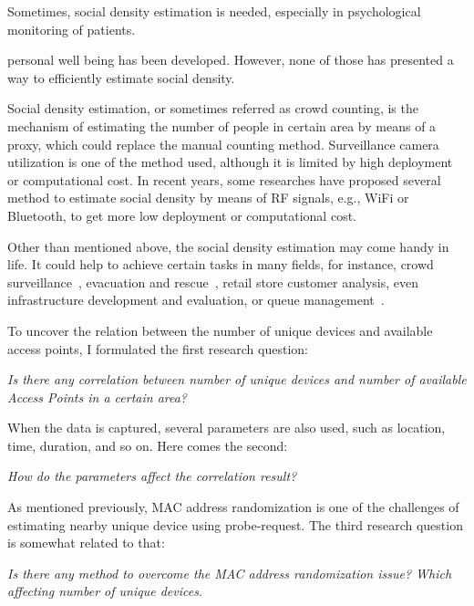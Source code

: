 Sometimes, social density estimation is needed, especially in psychological monitoring of patients.

personal well being has been developed. However, none of those has presented a way to efficiently estimate social density.

Social density estimation, or sometimes referred as crowd counting, is the mechanism of estimating the number of people in certain area by means of a proxy, which could replace the manual counting method. Surveillance camera utilization is one of the method used, although it is limited by high deployment or computational cost. In recent years, some researches have proposed several method to estimate social density by means of RF signals, e.g., WiFi or Bluetooth, to get more low deployment or computational cost.

Other than mentioned above, the social density estimation may come handy in life. It could help to achieve certain tasks in many fields, for instance, crowd surveillance~\cite{thesis050}, evacuation and rescue~\cite{thesis045}, retail store customer analysis, even infrastructure development and evaluation, or queue management~\cite{thesis012}.




To uncover the relation between the number of unique devices and available access points, I formulated the first research question:
\begin{displayquote}\textit{
Is there any correlation between number of unique devices and number of available Access Points in a certain area?}
\end{displayquote}

When the data is captured, several parameters are also used, such as location, time, duration, and so on. Here comes the second:
\begin{displayquote}\textit{
How do the parameters affect the correlation result?}
\end{displayquote}

As mentioned previously, MAC address randomization is one of the challenges of estimating nearby unique device using probe-request. The third research question is somewhat related to that:
\begin{displayquote}\textit{
Is there any method to overcome the MAC address randomization issue? Which affecting number of unique devices.}
\end{displayquote}

